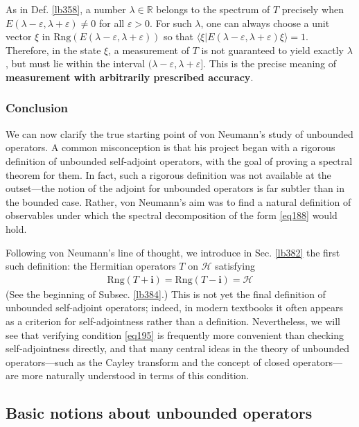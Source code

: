 \documentclass[12pt,b5paper,notitlepage]{article}
\theoremstyle{definition}
\theoremstyle{plain}
\newcommand{\bk}[1]{\langle {#1}\rangle}
\newcommand{\im}{\mathbf{i}}
\newcommand{\Rbb}{\mathbb R}
\newcommand{\Rng}{\mathrm{Rng}}
\newcommand{\eps}{\varepsilon}
\newcommand{\MH}{\mathcal H}
\numberwithin{equation}{section}
\begin{document}
As in Def. \ref{lb358}, a number $\lambda\in\Rbb$ belongs to the spectrum of $T$ precisely when $E(\lambda-\eps,\lambda+\eps)\neq0$ for all $\eps>0$. For such $\lambda$, one can always choose a unit vector $\xi$ in $\Rng(E(\lambda-\eps,\lambda+\eps))$ so that $\bk{\xi|E(\lambda-\eps,\lambda+\eps)\xi}=1$. Therefore, in the state $\xi$, a measurement of $T$ is not guaranteed to yield exactly $\lambda$, but must lie within the interval $(\lambda-\eps,\lambda+\eps]$. This is the precise meaning of \textbf{measurement with arbitrarily prescribed accuracy}.



\subsubsection{Conclusion}



We can now clarify the true starting point of von Neumann's study of unbounded operators. A common misconception is that his project began with a rigorous definition of unbounded self-adjoint operators, with the goal of proving a spectral theorem for them. In fact, such a rigorous definition was not available at the outset---the notion of the adjoint for unbounded operators is far subtler than in the bounded case. Rather, von Neumann's aim was to find a natural definition of observables under which the spectral decomposition of the form \eqref{eq188} would hold.

Following von Neumann's line of thought, we introduce in Sec. \ref{lb382} the first such definition: the Hermitian operators $T$ on $\MH$ satisfying
\begin{align}\label{eq195}
\Rng(T+\im)=\Rng(T-\im)=\MH
\end{align}
(See the beginning of Subsec. \ref{lb384}.) This is not yet the final definition of unbounded self-adjoint operators; indeed, in modern textbooks it often appears as a criterion for self-adjointness rather than a definition. Nevertheless, we will see that verifying condition \eqref{eq195} is frequently more convenient than checking self-adjointness directly, and that many central ideas in the theory of unbounded operators---such as the Cayley transform and the concept of closed operators---are more naturally understood in terms of this condition.


\subsection{Basic notions about unbounded operators}
\end{document}
